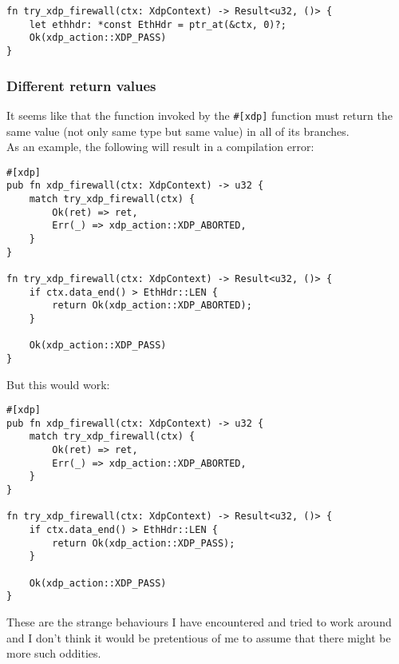 \documentclass{article}
\begin{document}
\begin{verbatim}
fn try_xdp_firewall(ctx: XdpContext) -> Result<u32, ()> {
    let ethhdr: *const EthHdr = ptr_at(&ctx, 0)?;
    Ok(xdp_action::XDP_PASS)
}
\end{verbatim}

\subsubsection*{Different return values}
It seems like that the function invoked by the \texttt{#[xdp]} function must return the same value (not only same type but same value) in all of its branches.\\
As an example, the following will result in a compilation error:
\begin{verbatim}
#[xdp]
pub fn xdp_firewall(ctx: XdpContext) -> u32 {
    match try_xdp_firewall(ctx) {
        Ok(ret) => ret,
        Err(_) => xdp_action::XDP_ABORTED,
    }
}

fn try_xdp_firewall(ctx: XdpContext) -> Result<u32, ()> {
    if ctx.data_end() > EthHdr::LEN {
        return Ok(xdp_action::XDP_ABORTED);
    }

    Ok(xdp_action::XDP_PASS)
}

\end{verbatim}

But this would work:

\begin{verbatim}
#[xdp]
pub fn xdp_firewall(ctx: XdpContext) -> u32 {
    match try_xdp_firewall(ctx) {
        Ok(ret) => ret,
        Err(_) => xdp_action::XDP_ABORTED,
    }
}

fn try_xdp_firewall(ctx: XdpContext) -> Result<u32, ()> {
    if ctx.data_end() > EthHdr::LEN {
        return Ok(xdp_action::XDP_PASS);
    }

    Ok(xdp_action::XDP_PASS)
}

\end{verbatim}

These are the strange behaviours I have encountered and tried to work around and I don't think it would be pretentious of me to assume that there might be more such oddities.
\end{document}
